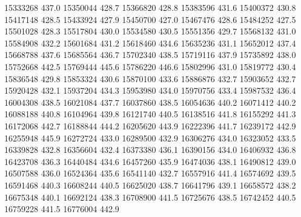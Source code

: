 15333268 437.0
15350044 428.7
15366820 428.8
15383596 431.6
15400372 430.8
15417148 428.5
15433924 427.9
15450700 427.0
15467476 428.6
15484252 427.5
15501028 428.3
15517804 430.0
15534580 430.5
15551356 429.7
15568132 431.0
15584908 432.2
15601684 431.2
15618460 434.6
15635236 431.1
15652012 437.4
15668788 437.6
15685564 436.7
15702340 438.5
15719116 437.9
15735892 438.0
15752668 442.5
15769444 445.6
15786220 446.6
15802996 431.0
15819772 430.4
15836548 429.8
15853324 430.6
15870100 433.6
15886876 432.7
15903652 432.7
15920428 432.1
15937204 434.3
15953980 434.0
15970756 433.4
15987532 436.4
16004308 438.5
16021084 437.7
16037860 438.5
16054636 440.2
16071412 440.2
16088188 440.8
16104964 439.8
16121740 440.5
16138516 441.8
16155292 441.3
16172068 442.7
16188844 444.2
16205620 443.9
16222396 441.7
16239172 442.9
16255948 445.9
16272724 433.0
16289500 432.9
16306276 434.0
16323052 433.5
16339828 432.8
16356604 432.4
16373380 436.1
16390156 434.0
16406932 436.8
16423708 436.3
16440484 434.6
16457260 435.9
16474036 438.1
16490812 439.0
16507588 436.0
16524364 435.6
16541140 432.7
16557916 441.4
16574692 439.5
16591468 440.3
16608244 440.5
16625020 438.7
16641796 439.1
16658572 438.2
16675348 440.1
16692124 438.3
16708900 441.5
16725676 438.5
16742452 440.5
16759228 441.5
16776004 442.9
